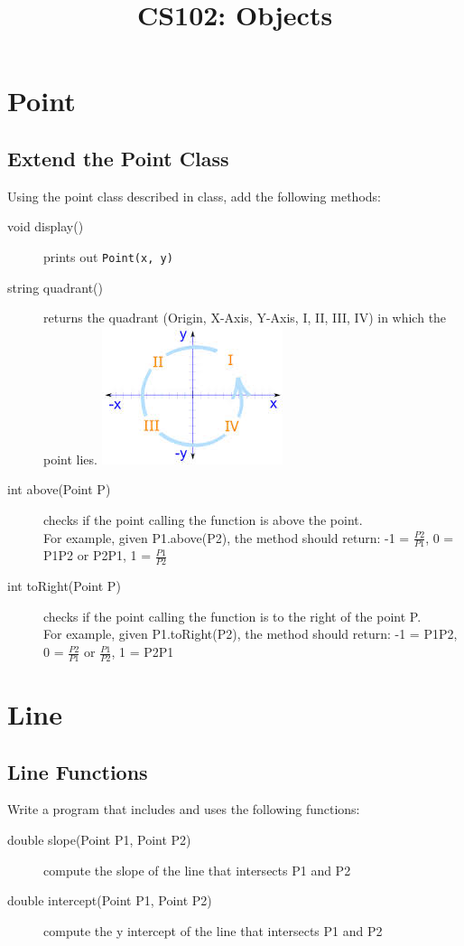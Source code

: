 \documentclass{article}
\begin{document}
\title{CS102: Objects}

\maketitle
\section{Point}
\subsection{Extend the Point Class}
Using the point class described in class, add the following methods:
\begin{description}
	\item [void display()] prints out \texttt{Point(x, y)}
	\item[string quadrant()] returns the quadrant (Origin, X-Axis, Y-Axis, I, II, III, IV) in which the point lies.
	\includegraphics[width=.25\textwidth]{images}
	\item[int above(Point P)] checks if the point calling the function is above the point. \\ For example, given P1.above(P2), the method should return: -1 = $\frac{P2}{P1}$, 0 = P1P2 or P2P1, 1 = $\frac{P1}{P2}$
	\item[int toRight(Point P)] checks if the point calling the function is to the right of the point P.\\ 
For example, given P1.toRight(P2), the method should return: -1 = P1P2, 0 = $\frac{P2}{P1}$ or $\frac{P1}{P2}$, 1 = P2P1
	
\end{description}
\section{Line}
\subsection{Line Functions}
Write a program that includes and uses the following functions:
\begin{description}
	\item[double slope(Point P1, Point P2)] compute the slope of the line that intersects P1 and P2
	\item[double intercept(Point P1, Point P2)] compute the y intercept of the line that intersects P1 and P2
\end{description}
\end{document}
